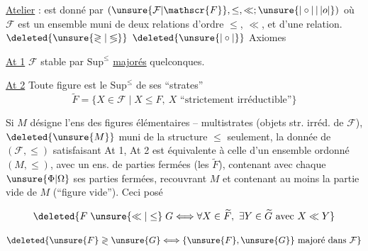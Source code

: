 \uline{Atelier} : est donné par $(\unsure{\mathcal{F}|\mathscr{F}},\leq,\ll;\unsure{|\circ|\,|\,|o|})$ où $\mathcal{F}$ est un ensemble muni de deux relations d'ordre $\leq$, $\ll$, et d'une  relation. $\deleted{\unsure{\gtrless|\lessgtr}}$ $\deleted{\unsure{|\circ|}}$ Axiomes

\uline{At 1} $\mathcal{F}$ stable par $\mathrm{Sup}^{\leq}$  \uline{majorés} quelconques.

\uline{At 2} Toute figure est le $\mathrm{Sup}^{\leq}$ de  ses ``strates''
\[
\widetilde{F}=\{X\in\mathcal{F}\mid X\leq F,\ X\text{ ``strictement irréductible''}\}
\]

 Si $M$ désigne l'ens des figures élémentaires -- multistrates (objets str. irréd. de $\mathcal{F}$), $\deleted{\unsure{M}}$ muni de la structure $\leq$ seulement,  la donnée de $(\mathcal{F},\leq)$ satisfaisant  At 1, At 2  est équivalente à celle d'un ensemble ordonné $(M,\leq)$, avec un ens. de parties fermées (les $\widetilde{F}$), contenant avec chaque $\unsure{\Phi|\Omega}$ ses parties fermées,  recouvrant $M$  et contenant au moins la partie vide de $M$ (``figure vide''). Ceci posé

\[
\deleted{F\mathrel{\unsure{\ll|\leq}}G\Longleftrightarrow\forall X\in\widetilde{F},\ \exists Y\in\widetilde{G}\text{ avec }X\ll Y}
\]

\[
\deleted{\unsure{F}\mathrel{\gtrless}\unsure{G}\Longleftrightarrow\{\unsure{F},\unsure{G}\}\text{ majoré dans }\mathcal{F}}
\]
